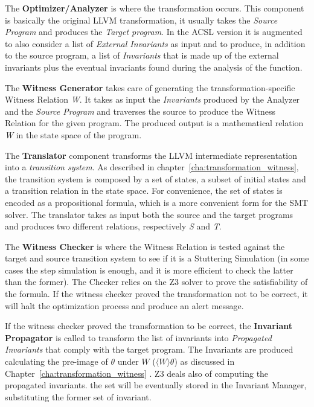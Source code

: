The \textbf{Optimizer/Analyzer} is where the transformation occurs. This component is basically the original LLVM transformation, it usually takes the \emph{Source Program} and produces the \emph{Target program}. In the ACSL version it is augmented to also consider a list of \emph{External Invariants} as input and to produce, in addition to the source program, a list of \emph{Invariants} that is made up of the external invariants plus the eventual invariants found during the analysis of the function.

The \textbf{Witness Generator} takes care of generating the transformation-specific Witness Relation \emph{W}. It takes as input the \emph{Invariants} produced by the Analyzer and the \emph{Source Program} and traverses the source to produce the Witness Relation for the given program. The produced output is a mathematical relation \emph{W} in the state space of the program.

The \textbf{Translator} component transforms the LLVM intermediate representation into a \emph{transition system}. As described in chapter~\ref{cha:transformation_witness}, the transition system is composed by a set of states, a subset of initial states and a transition relation in the state space. For convenience, the set of states is encoded as a propositional formula, which is a more convenient form for the SMT solver. The translator takes as input both the source and the target programs and produces two different relations, respectively \emph{S} and \emph{T}.

The \textbf{Witness Checker} is where the Witness Relation is tested against the target and source transition system to see if it is a Stuttering Simulation (in some cases the step simulation is enough, and it is more efficient to check the latter than the former). The Checker relies on the Z3 solver to prove the satisfiability of the formula. If the witness checker proved the transformation not to be correct, it will halt the optimization process and produce an alert message.

If the witness checker proved the transformation to be correct, the \textbf{Invariant Propagator} is called to transform the list of invariants into \emph{Propagated Invariants} that comply with the target program. The Invariants are produced calculating the pre-image of $\theta$ under $W$ ($\langle W \rangle \theta$) as discussed in Chapter~\ref{cha:transformation_witness} . Z3 deals also of computing the propagated invariants. the set will be eventually stored in the Invariant Manager, substituting the former set of invariant.

